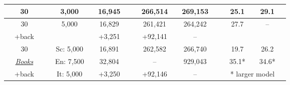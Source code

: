 \begin{table}[t]
\begin{center}
\begin{tabular}{ccc|ccccc|ccccc|ccccc}
      \hline
      &  30  & & &  3,000  & & 16,945  & & &  266,514  & &  269,153  & & &  25.1  & &  29.1  & \\
      \hline
      &  30  & & &  5,000  & & 16,829  & & &  261,421  & &  264,242  & & &  27.7  & &  --    & \\
      &  +back  & & &      & & +3,251  & & &  +92,141  & &    --     & & &        & &        & \\
      \hline
      &  30     & & &  Sc: 5,000  & & 16,891  & & &  262,582  & &  266,740  & & &  19.7  & &  26.2  & \\
      &  \textit{\href{https://farkastranslations.com/bilingual_books.php}{Books}}
                & & &  En: 7,500  & & 32,804  & & &   --      & &  929,043  & & &  35.1* & &  34.6* & \\
      &  +back  & & &  It: 5,000  & & +3,250  & & &  +92,146  & &   --      & & &  \multicolumn{3}{c}{* larger model} & \\
      \hline
      \hline
    \end{tabular}
  \end{center}
\end{table}
